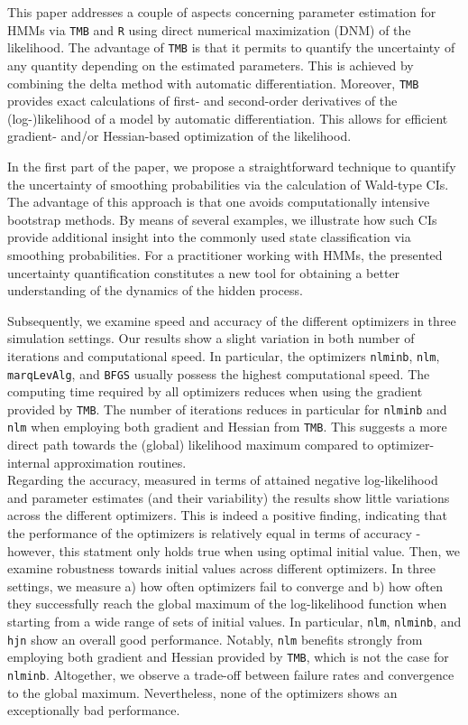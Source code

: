 \documentclass[]{interact}\usepackage[]{graphicx}\usepackage[dvipsnames]{xcolor}
\theoremstyle{plain}%
\theoremstyle{definition}
\theoremstyle{remark}
\begin{document}
This paper addresses a couple of aspects concerning parameter estimation for HMMs via {\tt{TMB}} and {\tt{R}} using direct numerical maximization (DNM) of the likelihood. The advantage of {\tt{TMB}} is that it permits to quantify the uncertainty of any quantity depending on the estimated parameters. This is achieved by combining the delta method with automatic differentiation.
Moreover, {\tt{TMB}} provides exact calculations of first- and second-order derivatives of the (log-)likelihood of a model by automatic differentiation. This allows for efficient gradient- and/or Hessian-based optimization of the likelihood.   

In the first part of the paper, we propose a straightforward technique to quantify the uncertainty of smoothing probabilities via the calculation of Wald-type CIs. The advantage of this approach is that one avoids computationally intensive bootstrap methods. By means of several examples, we illustrate how such CIs provide additional insight into the commonly used state classification via smoothing probabilities. For a practitioner working with HMMs, the presented uncertainty quantification constitutes a new tool for obtaining a better understanding of the dynamics of the hidden process.

Subsequently, we examine speed and accuracy of the different optimizers in three simulation settings. Our results show a slight variation in both number of iterations and computational speed. In particular, the optimizers {\tt{nlminb}}, {\tt{nlm}}, {\tt{marqLevAlg}}, and {\tt{BFGS}} usually possess the highest computational speed. The computing time required by all optimizers reduces when using the gradient provided by {\tt{TMB}}. The number of iterations reduces in particular for {\tt{nlminb}} and {\tt{nlm}} when employing both gradient and Hessian from {\tt{TMB}}. This suggests a more direct path towards the (global) likelihood maximum compared to optimizer-internal approximation routines.\\ 
Regarding the accuracy, measured in terms of attained negative log-likelihood and parameter estimates (and their variability) the results show little variations across the different optimizers. This is indeed a  positive finding, indicating that the performance of the optimizers is relatively equal in terms of accuracy - however, this statment only holds true when using optimal initial value.       
Then, we examine robustness towards initial values across different optimizers. In three settings, we measure a) how often optimizers fail to converge and b) how often they successfully reach the global maximum of the log-likelihood function when starting from a wide range of sets of initial values. In particular, {\tt{nlm}}, {\tt{nlminb}}, and {\tt{hjn}} show an overall good performance. Notably, {\tt{nlm}} benefits strongly from employing both gradient and Hessian provided by {\tt{TMB}}, which is not the case for {\tt{nlminb}}. Altogether, we observe a trade-off between failure rates and convergence to the global maximum. Nevertheless, none of the optimizers shows an exceptionally bad performance.
\end{document}
